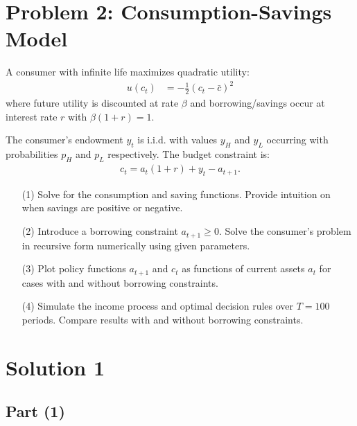 \documentclass[10pt,a4paper]{article}
\begin{document}
\section*{Problem 2: Consumption-Savings Model}
A consumer with infinite life maximizes quadratic utility:
\begin{align*}
    u(c_t) &= -\frac{1}{2} (c_t - \bar{c})^2
\end{align*}
where future utility is discounted at rate $\beta$ and borrowing/savings occur at interest rate $r$ with $\beta(1+r) = 1$.

The consumer’s endowment $y_t$ is i.i.d. with values $y_H$ and $y_L$ occurring with probabilities $p_H$ and $p_L$ respectively. The budget constraint is:
\begin{align*}
    c_t = a_t(1+r) + y_t - a_{t+1}.
\end{align*}

\begin{enumerate}
    \item[(1)] Solve for the consumption and saving functions. Provide intuition on when savings are positive or negative.
    \item[(2)] Introduce a borrowing constraint $a_{t+1} \geq 0$. Solve the consumer’s problem in recursive form numerically using given parameters.
    \item[(3)] Plot policy functions $a_{t+1}$ and $c_t$ as functions of current assets $a_t$ for cases with and without borrowing constraints.
    \item[(4)] Simulate the income process and optimal decision rules over $T=100$ periods. Compare results with and without borrowing constraints.
\end{enumerate}

\section*{Solution 1}
  \subsection*{Part (1)}
       
\end{document}

